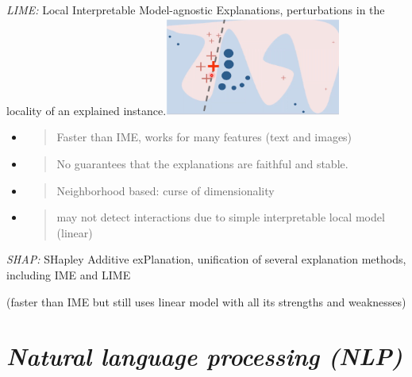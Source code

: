 \textit{LIME:} Local Interpretable Model-agnostic Explanations,
perturbations in the locality of an explained
instance.\includegraphics[width=2.27342in,height=1.27262in]{media/image25.png}

\begin{itemize}
\item
  \begin{quote}
  Faster than IME, works for many features (text and images)
  \end{quote}
\end{itemize}

\begin{itemize}
\item
  \begin{quote}
  No guarantees that the explanations are faithful and stable.
  \end{quote}
\end{itemize}

\begin{itemize}
\item
  \begin{quote}
  Neighborhood based: curse of dimensionality
  \end{quote}
\end{itemize}

\begin{itemize}
\item
  \begin{quote}
  may not detect interactions due to simple interpretable local model
  (linear)
  \end{quote}
\end{itemize}

\textit{SHAP:} SHapley Additive exPlanation, unification of several
explanation methods, including IME and LIME

(faster than IME but still uses linear model with all its strengths and
weaknesses)

\hypertarget{natural-language-processing-nlp}{%
\section{\texorpdfstring{\textit{Natural language processing
(NLP)}}{Natural language processing (NLP)}}\label{natural-language-processing-nlp}}

